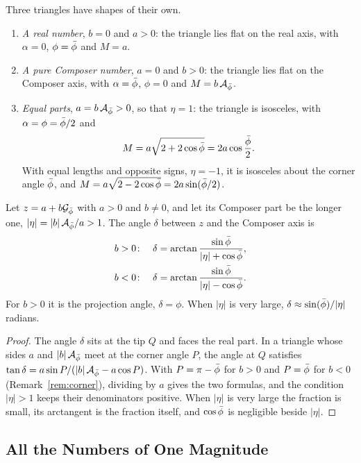 \begin{remark}\label{rem:special-triangles}
Three triangles have shapes of their own.
\begin{enumerate}
  \item \emph{A real number}, $b = 0$ and $a > 0$: the triangle lies flat on the real axis, with $\alpha = 0$, $\phi = \bar{\phi}$ and $M = a$.
  \item \emph{A pure Composer number}, $a = 0$ and $b > 0$: the triangle lies flat on the Composer axis, with $\alpha = \bar{\phi}$, $\phi = 0$ and $M = b\,\mathcal{A}_{\bar{\phi}}$.
  \item \emph{Equal parts}, $a = b\,\mathcal{A}_{\bar{\phi}} > 0$, so that $\eta = 1$: the triangle is isosceles, with $\alpha = \phi = \bar{\phi}/2$ and
  \[
  M = a\sqrt{2 + 2\cos\bar{\phi}} = 2a\cos\frac{\bar{\phi}}{2} .
  \]
  With equal lengths and opposite signs, $\eta = -1$, it is isosceles about the corner angle $\bar{\phi}$, and $M = a\sqrt{2 - 2\cos\bar{\phi}} = 2a\sin(\bar{\phi}/2)$.
\end{enumerate}
\end{remark}

\begin{proposition}\label{prop:near-axis}
Let $z = a + b\mathcal{G}_{\bar{\phi}}$ with $a > 0$ and $b \neq 0$, and let its Composer part be the longer one, $|\eta| = |b|\,\mathcal{A}_{\bar{\phi}}/a > 1$. The angle $\delta$ between $z$ and the Composer axis is
\begin{align*}
b > 0\colon\quad \delta &= \arctan\frac{\sin\bar{\phi}}{|\eta| + \cos\bar{\phi}}, \\
b < 0\colon\quad \delta &= \arctan\frac{\sin\bar{\phi}}{|\eta| - \cos\bar{\phi}}.
\end{align*}
For $b > 0$ it is the projection angle, $\delta = \phi$. When $|\eta|$ is very large, $\delta \approx \sin(\bar{\phi})/|\eta|$ radians.
\end{proposition}

\begin{proof}
The angle $\delta$ sits at the tip $Q$ and faces the real part. In a triangle whose sides $a$ and $|b|\,\mathcal{A}_{\bar{\phi}}$ meet at the corner angle $P$, the angle at $Q$ satisfies $\tan\delta = a\sin P/(|b|\,\mathcal{A}_{\bar{\phi}} - a\cos P)$. With $P = \pi - \bar{\phi}$ for $b > 0$ and $P = \bar{\phi}$ for $b < 0$ (Remark~\ref{rem:corner}), dividing by $a$ gives the two formulas, and the condition $|\eta| > 1$ keeps their denominators positive. When $|\eta|$ is very large the fraction is small, its arctangent is the fraction itself, and $\cos\bar{\phi}$ is negligible beside $|\eta|$.
\end{proof}

\subsection{All the Numbers of One Magnitude}\label{sec:one-magnitude}

